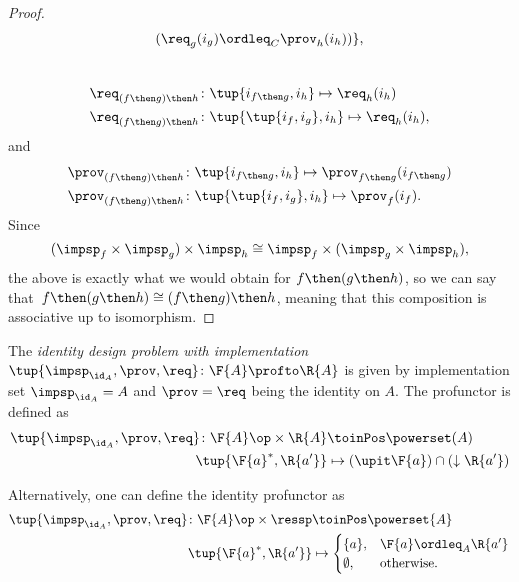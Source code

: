 \begin{proof}
\begin{equation}
\begin{aligned}
      (\req_g(i_g) \ordleq_{C} \prov_h(i_h))
      \},
    \end{aligned}
  \end{equation}
  ~
  \begin{equation}
    \begin{aligned}
      \req_{(f\then g)\then h}  &\colon  \tup{i_{f\then g},i_h} \mapsto \req_h(i_h) \\
      \req_{(f\then g)\then h}  &\colon  \tup{\tup{i_f, i_g},i_h} \mapsto \req_h(i_h),
    \end{aligned}
  \end{equation}
  and
  \begin{equation}
    \begin{aligned}
      \prov_{(f\then g)\then h}  &\colon  \tup{i_{f\then g},i_h} \mapsto \prov_{f\then g}(i_{f\then g})\\
      \prov_{(f\then g)\then h}  &\colon  \tup{\tup{i_f, i_g},i_h} \mapsto \prov_f(i_f).
    \end{aligned}
  \end{equation}
  Since
  \begin{equation}
  (\impsp_f \times \impsp_g)
    \times \impsp_{h} \cong  \impsp_f \times (\impsp_g \times \impsp_{h}),
  \end{equation}
  the above is exactly what we would obtain for $f\then (g\then h)$, so we can say
  that~$f\then(g\then h)\cong (f\then g)\then h$, meaning that this composition is associative up to isomorphism.
\end{proof}

\begin{definition}
  \label{def:identitydpi}
  The \emph{identity design problem with implementation}~$\tup{\impsp_{\id_A},\prov,\req} \colon \F{A} \profto \R{A}$ is given by implementation set $\impsp_{\id_A} = A$ and $\prov=\req$ being
  the identity on $A$. The profunctor is defined as
  \begin{align}
    \tup{\impsp_{\id_A},\prov,\req} \colon \F{A}\op \times \R{A} &\toinPos \powerset(A) \\
    \tup{\F{a}^*,\R{a'}} &\mapsto (\upit \F{a}) \cap (\downarrow \R{a'})
  \end{align}
\end{definition}
\begin{remark}
  Alternatively, one can define the identity profunctor as
  \begin{align}
    \tup{\impsp_{\id_A},\prov,\req}\colon \F{A}\op \times \ressp &\toinPos \powerset{A}\\
    \tup{\F{a}^*,\R{a'}}&\mapsto
    \begin{cases}
      \{a\},&\F{a}\ordleq_A \R{a'}\\
      \emptyset, &\text{otherwise}.
    \end{cases}
  \end{align}
\end{remark}

